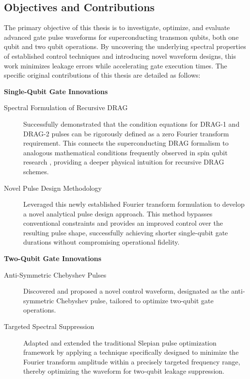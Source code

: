 \subsection{Objectives and Contributions}
The primary objective of this thesis is to investigate, optimize, and evaluate advanced gate pulse waveforms for
superconducting transmon qubits, both one qubit and two qubit operations. By uncovering the underlying spectral
properties of established control techniques and introducing novel waveform designs, this work minimizes leakage errors
while accelerating gate execution times. The specific original contributions of this thesis are detailed as follows:

\noindent\textbf{Single-Qubit Gate Innovations}
\begin{description}
  \item[Spectral Formulation of Recursive DRAG ] Successfully demonstrated that the condition equations for DRAG-1 and DRAG-2
        pulses can be rigorously defined as a zero Fourier transform requirement. This connects the superconducting DRAG
        formalism to analogous mathematical conditions frequently observed in spin qubit research \cite{freeman,hoult1979,vold1968,warren1984}, providing a deeper physical
        intuition for recursive DRAG schemes.


  \item[Novel Pulse Design Methodology ] Leveraged this newly established Fourier transform formulation to develop a
        novel analytical pulse design approach. This method bypasses conventional constraints and provides an improved
        control over the resulting pulse shape, successfully achieving shorter
        single-qubit gate durations without compromising operational fidelity.
\end{description}

\noindent\textbf{Two-Qubit Gate Innovations}

\begin{description}
  \item[Anti-Symmetric Chebyshev Pulses ] Discovered and proposed a novel control waveform, designated as the anti-symmetric
        Chebyshev pulse, tailored to optimize two-qubit gate operations.

  \item[Targeted Spectral Suppression ] Adapted and extended the traditional Slepian pulse optimization framework by applying a
        technique specifically designed to minimize the Fourier transform amplitude within a precisely targeted frequency range,
        thereby optimizing the waveform for two-qubit leakage suppression.
\end{description}

